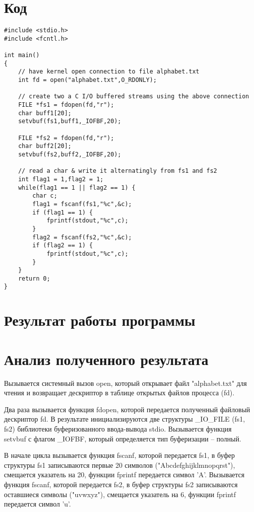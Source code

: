 \section{Код}
\begin{lstlisting}[caption={Программа 1}, label=lst:p1]
#include <stdio.h>
#include <fcntl.h>

int main()
{
	// have kernel open connection to file alphabet.txt
	int fd = open("alphabet.txt",O_RDONLY);
	
	// create two a C I/O buffered streams using the above connection 
	FILE *fs1 = fdopen(fd,"r");
	char buff1[20];
	setvbuf(fs1,buff1,_IOFBF,20);
	
	FILE *fs2 = fdopen(fd,"r");
	char buff2[20];
	setvbuf(fs2,buff2,_IOFBF,20);
	
	// read a char & write it alternatingly from fs1 and fs2
	int flag1 = 1,flag2 = 1;
	while(flag1 == 1 || flag2 == 1) {
		char c;
		flag1 = fscanf(fs1,"%c",&c);
		if (flag1 == 1) {
			fprintf(stdout,"%c",c);
		}
		flag2 = fscanf(fs2,"%c",&c);
		if (flag2 == 1) { 
			fprintf(stdout,"%c",c); 
		}
	}
	return 0;
}
\end{lstlisting}


\section{Результат работы программы}
\FloatBarrier
{}
\FloatBarrier

\section{Анализ полученного результата}
Вызывается системный вызов open, который открывает файл "alphabet.txt" для чтения и возвращает дескриптор в таблице открытых файлов процесса (fd). 

Два раза вызывается функция fdopen, которой передается полученный файловый дескриптор fd. В результате инициализируются две структуры \_IO\_FILE (fs1, fs2) библиотеки буферизованного ввода-вывода stdio. Вызывается функция setvbuf с флагом \_IOFBF, который определяется тип буферизации -- полный.

В начале цикла вызывается функция fscanf, которой передается fs1, в буфер структуры fs1 записываются первые 20 символов ("Abcdefghijklmnopqrst"), смещается указатель на 20, функции fprintf передается символ 'A'. Вызывается функция fscanf, которой передается fs2, в буфер структуры fs2 записываются оставшиеся символы ("uvwxyz"), смещается указатель на 6, функции fprintf передается символ 'u'. 

